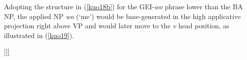 \documentclass[output=paper,colorlinks,citecolor=brown]{langscibook}
\begin{document}
\ea
\label{kuo18}
    \z
\z

Adopting the structure in (\ref{kuo18b}) for the GEI-\textit{wo} phrase lower than the BA NP, the applied NP \textit{wo} (`me') would be base-generated in the high applicative projection right above VP and would later move to the \textit{v} head position, as illustrated in (\ref{kuo19}).

\ea
\label{kuo19}
\glt [{\scriptsize TP} ..... [{\scriptsize \textit{v}P}   gei{\scriptsize i}  [{\scriptsize ApplHP}  wo    t{\scriptsize i}   [{\scriptsize VP} .....]]]]\\  
\z
\end{document}
